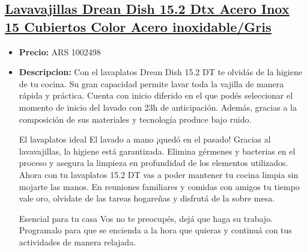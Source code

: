 \documentclass{article}
\begin{document}
    
    \begin{adjustwidth}{2em}{}

    \subsection{\underline{\href{https://www.mercadolibre.com.ar/lavavajillas-drean-dish-152-dtx-acero-inox-15-cubiertos-color-acero-inoxidablegris/p/MLA12187952}{Lavavajillas Drean Dish 15.2 Dtx Acero Inox 15 Cubiertos Color Acero inoxidable/Gris}}}
    \begin{itemize}
        \item \textbf{Precio:} ARS 1002498
        \item \textbf{Descripcion:} Con el lavaplatos Drean Dish 15.2 DT te olvidás de la higiene de tu cocina. Su gran capacidad permite lavar toda la vajilla de manera rápida y práctica. Cuenta con inicio diferido en el que podés seleccionar el momento de inicio del lavado con 23h de anticipación. Además, gracias a la composición de sus materiales y tecnología produce bajo ruido.

El lavaplatos ideal
El lavado a mano ¡quedó en el pasado! Gracias al lavavajillas,  la higiene está garantizada. Elimina gérmenes y bacterias en el proceso y asegura la limpieza en profundidad de los elementos utilizados. Ahora con tu lavaplatos 15.2 DT vas a poder mantener tu cocina limpia sin mojarte las manos. En reuniones familiares y comidas con amigos tu tiempo vale oro, olvidate de las tareas hogareñas y disfrutá de la sobre mesa.

Esencial para tu casa
Vos no te preocupés, dejá que haga su trabajo. Programalo para que se encienda a la hora que quieras y continuá con tus actividades de manera relajada.


\end{itemize}
\end{adjustwidth}
\end{document}
